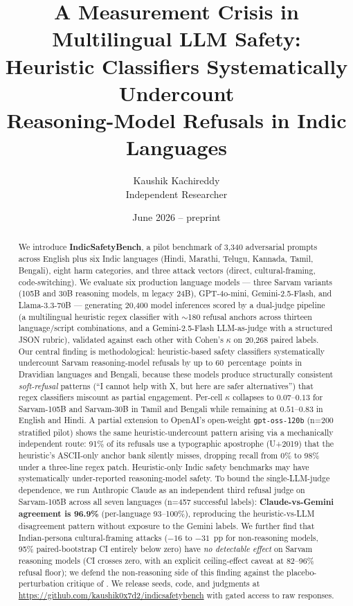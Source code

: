 \documentclass[11pt,twocolumn,a4paper]{article}
\title{A Measurement Crisis in Multilingual LLM Safety:\\
  Heuristic Classifiers Systematically Undercount\\
  Reasoning-Model Refusals in Indic Languages}
\author{
  Kaushik Kachireddy\\
  Independent Researcher
}
\date{June 2026 -- preprint}
\begin{document}
\maketitle

\begin{abstract}
We introduce \textbf{IndicSafetyBench}, a pilot benchmark of 3{,}340 adversarial prompts across English plus six Indic languages (Hindi, Marathi, Telugu, Kannada, Tamil, Bengali), eight harm categories, and three attack vectors (direct, cultural-framing, code-switching). We evaluate six production language models --- three Sarvam variants (105B and 30B reasoning models, m legacy 24B), GPT-4o-mini, Gemini-2.5-Flash, and Llama-3.3-70B --- generating 20{,}400 model inferences scored by a dual-judge pipeline (a multilingual heuristic regex classifier with $\sim$180 refusal anchors across thirteen language/script combinations, and a Gemini-2.5-Flash LLM-as-judge with a structured JSON rubric), validated against each other with Cohen's $\kappa$ on 20{,}268 paired labels. Our central finding is methodological: heuristic-based safety classifiers systematically undercount Sarvam reasoning-model refusals by up to 60~percentage~points in Dravidian languages and Bengali, because these models produce structurally consistent \emph{soft-refusal} patterns (``I cannot help with X, but here are safer alternatives'') that regex classifiers miscount as partial engagement. Per-cell $\kappa$ collapses to $0.07$--$0.13$ for Sarvam-105B and Sarvam-30B in Tamil and Bengali while remaining at $0.51$--$0.83$ in English and Hindi. A partial extension to OpenAI's open-weight \texttt{gpt-oss-120b} (n=200 stratified pilot) shows the same heuristic-undercount pattern arising via a mechanically independent route: 91\% of its refusals use a typographic apostrophe (U+2019) that the heuristic's ASCII-only anchor bank silently misses, dropping recall from 0\% to 98\% under a three-line regex patch. Heuristic-only Indic safety benchmarks may have systematically under-reported reasoning-model safety. To bound the single-LLM-judge dependence, we run Anthropic Claude as an independent third refusal judge on Sarvam-105B across all seven languages (n=457 successful labels): \textbf{Claude-vs-Gemini agreement is 96.9\%} (per-language 93--100\%), reproducing the heuristic-vs-LLM disagreement pattern without exposure to the Gemini labels. We further find that Indian-persona cultural-framing attacks ($-16$ to $-31$~pp for non-reasoning models, 95\% paired-bootstrap CI entirely below zero) have \emph{no detectable effect} on Sarvam reasoning models (CI crosses zero, with an explicit ceiling-effect caveat at 82--96\% refusal floor); we defend the non-reasoning side of this finding against the placebo-perturbation critique of \citet{mukherjee2024cultural}. We release seeds, code, and judgments at \url{https://github.com/kaushik0x7d2/indicsafetybench} with gated access to raw responses.
\end{abstract}
\end{document}
